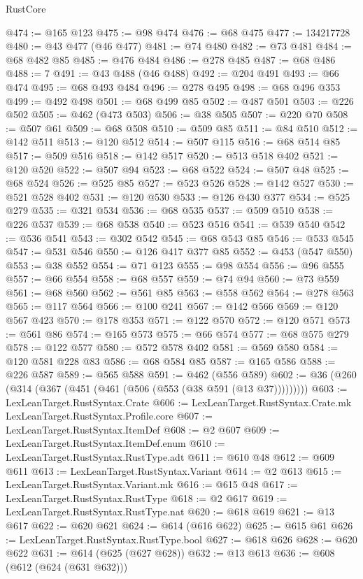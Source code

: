 \begin{lexlean}{RustCore}
\begin{coremodule}
@474 := @165 @123
@475 := @98 @474
@476 := @68 @475
@477 := 134217728
@480 := @43 @477 (@46 @477)
@481 := @74 @480
@482 := @73 @481
@484 := @68 @482 @85
@485 := @476 @484
@486 := @278 @485
@487 := @68 @486
@488 := 7
@491 := @43 @488 (@46 @488)
@492 := @204 @491
@493 := @66 @474
@495 := @68 @493 @484
@496 := @278 @495
@498 := @68 @496 @353
@499 := @492 @498
@501 := @68 @499 @85
@502 := @487 @501
@503 := @226 @502
@505 := @462 (@473 @503)
@506 := @38 @505
@507 := @220 @70
@508 := @507 @61
@509 := @68 @508
@510 := @509 @85
@511 := @84 @510
@512 := @142 @511
@513 := @120 @512
@514 := @507 @115
@516 := @68 @514 @85
@517 := @509 @516
@518 := @142 @517
@520 := @513 @518 @402
@521 := @120 @520
@522 := @507 @94
@523 := @68 @522
@524 := @507 @48
@525 := @68 @524
@526 := @525 @85
@527 := @523 @526
@528 := @142 @527
@530 := @521 @528 @402
@531 := @120 @530
@533 := @126 @430 @377
@534 := @525 @279
@535 := @321 @534
@536 := @68 @535
@537 := @509 @510
@538 := @226 @537
@539 := @68 @538
@540 := @523 @516
@541 := @539 @540
@542 := @536 @541
@543 := @302 @542
@545 := @68 @543 @85
@546 := @533 @545
@547 := @531 @546
@550 := @126 @417 @377 @85
@552 := @453 (@547 @550)
@553 := @38 @552
@554 := @71 @123
@555 := @98 @554
@556 := @96 @555
@557 := @66 @554
@558 := @68 @557
@559 := @74 @94
@560 := @73 @559
@561 := @68 @560
@562 := @561 @85
@563 := @558 @562
@564 := @278 @563
@565 := @117 @564
@566 := @100 @241
@567 := @142 @566
@569 := @120 @567 @423
@570 := @178 @353
@571 := @122 @570
@572 := @120 @571
@573 := @561 @86
@574 := @165 @573
@575 := @66 @574
@577 := @68 @575 @279
@578 := @122 @577
@580 := @572 @578 @402
@581 := @569 @580
@584 := @120 @581 @228 @83
@586 := @68 @584 @85
@587 := @165 @586
@588 := @226 @587
@589 := @565 @588
@591 := @462 (@556 @589)
@602 := @36 (@260 (@314 (@367 (@451 (@461 (@506 (@553 (@38 @591 (@13 @37)))))))))
@603 := LexLeanTarget.RustSyntax.Crate
@606 := LexLeanTarget.RustSyntax.Crate.mk LexLeanTarget.RustSyntax.Profile.core
@607 := LexLeanTarget.RustSyntax.ItemDef
@608 := @2 @607
@609 := LexLeanTarget.RustSyntax.ItemDef.enum
@610 := LexLeanTarget.RustSyntax.RustType.adt
@611 := @610 @48
@612 := @609 @611
@613 := LexLeanTarget.RustSyntax.Variant
@614 := @2 @613
@615 := LexLeanTarget.RustSyntax.Variant.mk
@616 := @615 @48
@617 := LexLeanTarget.RustSyntax.RustType
@618 := @2 @617
@619 := LexLeanTarget.RustSyntax.RustType.nat
@620 := @618 @619
@621 := @13 @617
@622 := @620 @621
@624 := @614 (@616 @622)
@625 := @615 @61
@626 := LexLeanTarget.RustSyntax.RustType.bool
@627 := @618 @626
@628 := @620 @622
@631 := @614 (@625 (@627 @628))
@632 := @13 @613
@636 := @608 (@612 (@624 (@631 @632)))

\end{coremodule}
\end{lexlean}
